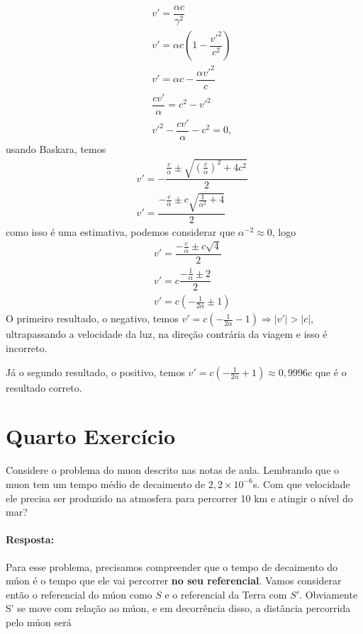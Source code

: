 \documentclass[10pt,a4paper]{article}
\begin{document}
	\begin{eqnarray}
	    && v' = \dfrac{\alpha c}{\gamma^2}\nonumber \\
		&& v' = \alpha c \left( 1 - \dfrac{v'^2}{c^2}\right) \nonumber \\
		&& v'  =  \alpha c - \dfrac{ \alpha v'^2}{c} \nonumber \\		
		&& \dfrac{ c v'}{\alpha} = c^2 - v'^2 \nonumber \\
		&& v'^2 - \dfrac{ c v'}{\alpha} - c^2 = 0, \nonumber
	\end{eqnarray}
	usando Baskara, temos
	\begin{eqnarray}
		&& v' = -\dfrac{\frac{c}{\alpha} \pm \sqrt{\left(\frac{c}{\alpha}\right)^2 +4c^2}}{2} \nonumber \\
		&& v' = \dfrac{-\frac{c}{\alpha} \pm c\sqrt{\frac{1}{\alpha^2} +4}}{2} \nonumber 
	\end{eqnarray}
	como isso é uma estimativa, podemos considerar que $ \alpha^{-2} \approx 0 $, logo
	\begin{eqnarray}
		&& v' = \dfrac{-\frac{c}{\alpha} \pm c\sqrt{4}}{2} \nonumber \\
		&& v' = c\dfrac{-\frac{1}{\alpha} \pm 2}{2} \nonumber\\
		&& v' = c\left(-\frac{1}{2\alpha} \pm 1\right) \nonumber 
	\end{eqnarray}
	O primeiro resultado, o negativo, temos
	$ v' = c\left(-\frac{1}{2\alpha} - 1\right) \Longrightarrow |v'| > |c|$, ultrapassando a velocidade da luz, na direção contrária da viagem e isso é incorreto.
	
	Já o segundo resultado, o positivo, temos
	$ v' = c\left(-\frac{1}{2\alpha} + 1\right) \approx 0,9996 c$ que é o resultado correto.

	
	\section{Quarto Exercício}	
	Considere o problema do muon descrito nas notas de aula. Lembrando que o muon tem um tempo médio de decaimento de $2,2\times 10^{-6}$s. Com que
	velocidade ele precisa ser produzido na atmosfera para percorrer 10 km e atingir o nível do mar?
	
	\paragraph{Resposta:}
	Para esse problema, precisamos compreender que o tempo de  decaimento do múon é o tempo que ele vai percorrer \textbf{no seu referencial}. Vamos considerar então o referencial do múon como \(S\) e o referencial da Terra com \(S'\). Obviamente S' se move com relação ao múon, e em decorrência disso, a distância percorrida pelo múon será 
	
\end{document}
